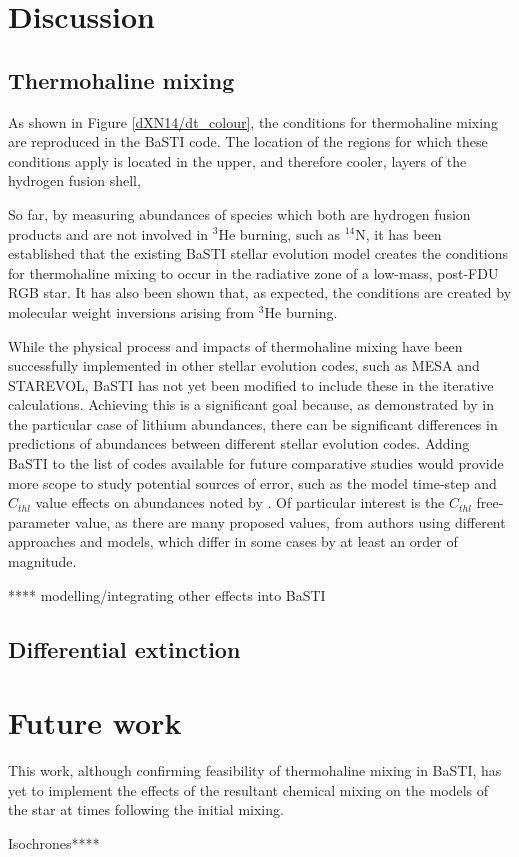 \documentclass[usenatbib]{mnras}
\begin{document}
\citet{2004astro.ph..5087C}


\section{Discussion}
\subsection{Thermohaline mixing}
As shown in Figure \ref{dXN14/dt_colour}, the conditions for thermohaline mixing are reproduced in the BaSTI code. The location of the regions for which these conditions apply is located in the upper, and therefore cooler, layers of the hydrogen fusion shell,

So far, by measuring abundances of species which both are hydrogen fusion products and are not involved in $^3$He burning, such as $^{14}$N, it has been established that the existing BaSTI stellar evolution model creates the conditions for thermohaline mixing to occur in the radiative zone of a low-mass, post-FDU RGB star. It has also been shown that, as expected, the conditions are created by molecular weight inversions arising from $^{3}$He burning.

While the physical process and impacts of thermohaline mixing have been successfully implemented in other stellar evolution codes, such as MESA and STAREVOL, BaSTI has not yet been modified to include these in the iterative calculations. Achieving this is a significant goal because, as demonstrated by \citet{2015MNRAS.446.2673L} in the particular case of lithium abundances, there can be significant differences in predictions of abundances between different stellar evolution codes. Adding BaSTI to the list of codes available for future comparative studies would provide more scope to study potential sources of error, such as the model time-step and $C_{thl}$ value effects on abundances noted by \citet{2015MNRAS.446.2673L}. Of particular interest is the $C_{thl}$ free-parameter value, as there are many proposed values, from authors using different approaches and models, which differ in some cases by at least an order of magnitude.

**** modelling/integrating other effects into BaSTI



\subsection{Differential extinction}

\section{Future work}

This work, although confirming feasibility of thermohaline mixing in BaSTI, has yet to implement the effects of the resultant chemical mixing on the models of the star at times following the initial mixing.

Isochrones****


\end{document}
